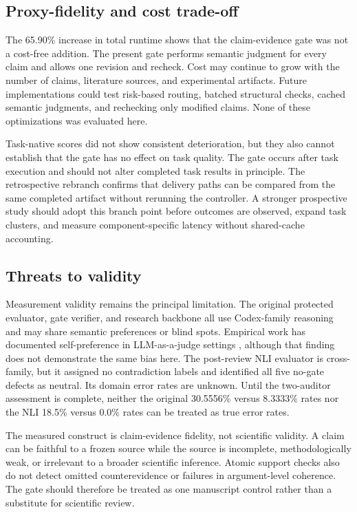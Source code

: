 \documentclass[11pt]{article}
\begin{document}
\subsection{Proxy-fidelity and cost trade-off}

The 65.90\% increase in total runtime shows that the claim-evidence gate was not a cost-free addition. The present gate performs semantic judgment for every claim and allows one revision and recheck. Cost may continue to grow with the number of claims, literature sources, and experimental artifacts. Future implementations could test risk-based routing, batched structural checks, cached semantic judgments, and rechecking only modified claims. None of these optimizations was evaluated here.

Task-native scores did not show consistent deterioration, but they also cannot establish that the gate has no effect on task quality. The gate occurs after task execution and should not alter completed task results in principle. The retrospective rebranch confirms that delivery paths can be compared from the same completed artifact without rerunning the controller. A stronger prospective study should adopt this branch point before outcomes are observed, expand task clusters, and measure component-specific latency without shared-cache accounting.

\subsection{Threats to validity}

Measurement validity remains the principal limitation. The original protected evaluator, gate verifier, and research backbone all use Codex-family reasoning and may share semantic preferences or blind spots. Empirical work has documented self-preference in LLM-as-a-judge settings \cite{selfpreference}, although that finding does not demonstrate the same bias here. The post-review NLI evaluator is cross-family, but it assigned no contradiction labels and identified all five no-gate defects as neutral. Its domain error rates are unknown. Until the two-auditor assessment is complete, neither the original 30.5556\% versus 8.3333\% rates nor the NLI 18.5\% versus 0.0\% rates can be treated as true error rates.

The measured construct is claim-evidence fidelity, not scientific validity. A claim can be faithful to a frozen source while the source is incomplete, methodologically weak, or irrelevant to a broader scientific inference. Atomic support checks also do not detect omitted counterevidence or failures in argument-level coherence. The gate should therefore be treated as one manuscript control rather than a substitute for scientific review.
\end{document}
